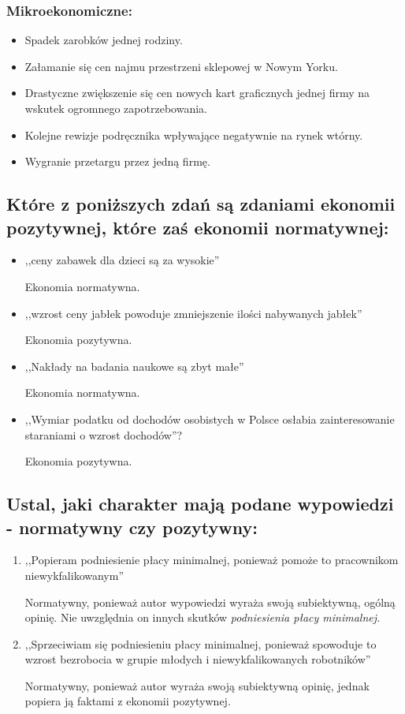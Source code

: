 \documentclass[a4paper,12pt]{article}
\begin{document}
\subsubsection*{Mikroekonomiczne:}

\begin{itemize}
	\item Spadek zarobków jednej rodziny.
	\item Załamanie się cen najmu przestrzeni sklepowej w Nowym Yorku.
	\item Drastyczne zwiększenie się cen nowych kart graficznych jednej firmy na wskutek ogromnego zapotrzebowania.
	\item Kolejne rewizje podręcznika wpływające negatywnie na rynek wtórny.
	\item Wygranie przetargu przez jedną firmę.
\end{itemize}

\subsection{Które z poniższych zdań są zdaniami ekonomii pozytywnej, które zaś ekonomii normatywnej:}

\begin{itemize}
	\item ,,ceny zabawek dla dzieci są za wysokie''

	      Ekonomia normatywna.

	\item ,,wzrost ceny jabłek powoduje zmniejszenie ilości nabywanych jabłek''

	      Ekonomia pozytywna.

	\item ,,Nakłady na badania naukowe są zbyt małe''

	      Ekonomia normatywna.

	\item ,,Wymiar podatku od dochodów osobistych w Polsce osłabia zainteresowanie staraniami o wzrost dochodów''?

	      Ekonomia pozytywna.
\end{itemize}

\subsection{Ustal, jaki charakter mają podane wypowiedzi - normatywny czy pozytywny:}

\begin{enumerate}
	\item ,,Popieram podniesienie płacy minimalnej, ponieważ pomoże to pracownikom niewykfalikowanym''

	      Normatywny, ponieważ autor wypowiedzi wyraża swoją subiektywną, ogólną opinię. Nie  uwzględnia on innych skutków \emph{podniesienia płacy minimalnej.}

	\item ,,Sprzeciwiam się podniesieniu płacy minimalnej, ponieważ spowoduje to wzrost bezrobocia w grupie młodych i niewykfalikowanych robotników''

	      Normatywny, ponieważ autor wyraża swoją subiektywną opinię, jednak popiera ją faktami z ekonomii pozytywnej.
\end{enumerate}
\end{document}

